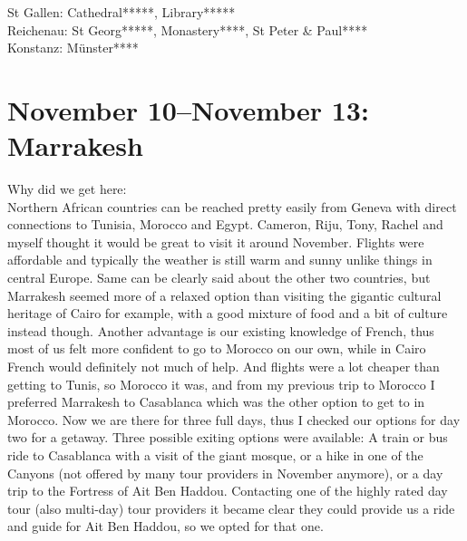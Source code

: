 St Gallen: Cathedral*****, Library*****\\
Reichenau: St Georg*****, Monastery****, St Peter \& Paul****\\
Konstanz: M\"unster****

\section{November 10--November 13: Marrakesh}
\label{Marrakesh2017}

Why did we get here:\\
Northern African countries can be reached pretty easily from Geneva with direct connections to Tunisia, Morocco and Egypt. Cameron, Riju, Tony, Rachel and myself thought it would be great to visit it around November. Flights were affordable and typically the weather is still warm and sunny unlike things in central Europe. Same can be clearly said about the other two countries, but Marrakesh seemed more of a relaxed option than visiting the gigantic cultural heritage of Cairo for example, with a good mixture of food and a bit of culture instead though. Another advantage is our existing knowledge of French, thus most of us felt more confident to go to Morocco on our own, while in Cairo French would definitely not much of help. And flights were a lot cheaper than getting to Tunis, so Morocco it was, and from my previous trip to Morocco I preferred Marrakesh to Casablanca which was the other option to get to in Morocco. Now we are there for three full days, thus I checked our options for day two for a getaway. Three possible exiting options were available: A train or bus ride to Casablanca with a visit of the giant mosque, or a hike in one of the Canyons (not offered by many tour providers in November anymore), or a day trip to the Fortress of Ait Ben Haddou. Contacting one of the highly rated day tour (also multi-day) tour providers it became clear they could provide us a ride and guide for Ait Ben Haddou, so we opted for that one.\\

